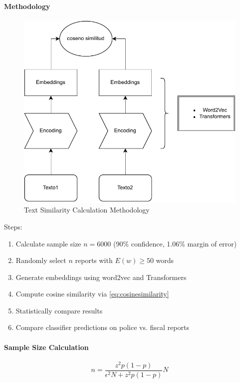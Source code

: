 \documentclass[onecolumn, journal, english, 12pt, a4paper]{IEEEtran} %
\theoremstyle{definition}
\begin{document}
\paragraph{Methodology}
\begin{figure}
    \centering
    \includegraphics[scale=.75]{imgs/CosenoSimilitud.drawio.pdf}
    \caption{Text Similarity Calculation Methodology}
    \label{fig:metodologiaSimilitudTexto}
\end{figure}

Steps:
\begin{enumerate}
    \item Calculate sample size $n=6000$ (90\% confidence, 1.06\% margin of error)
    \item Randomly select $n$ reports with $E(w)\geq50$ words
    \item Generate embeddings using word2vec and Transformers
    \item Compute cosine similarity via \eqref{eq:cosinesimilarity}
    \item Statistically compare results
    \item Compare classifier predictions on police vs. fiscal reports
\end{enumerate}

\paragraph{Sample Size Calculation}
\begin{equation*}
        n =\frac{z^2p(1-p) }{\epsilon^2N+z^2p(1-p)}N
\end{equation*}
\end{document}
